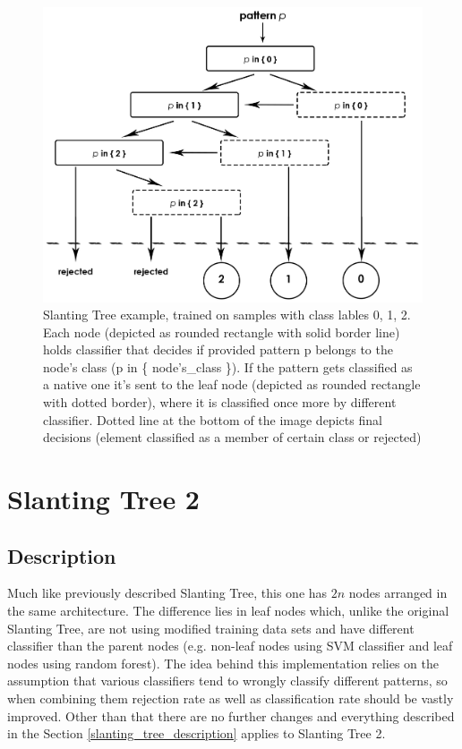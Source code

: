\begin{figure}[!t]
	\centering
	\includegraphics[width=1\textwidth]{Figures/slanting_tree.jpg}
	\caption{Slanting Tree example, trained on samples with class lables 0, 1, 2. Each node (depicted as rounded rectangle with solid border line) holds classifier that decides if provided pattern p belongs to the node's class (p in \{ node's\_class \}). If the pattern gets classified as a native one it's sent to the leaf node (depicted as rounded rectangle with dotted border), where it is classified once more by different classifier. Dotted line at the bottom of the image depicts final decisions (element classified as a member of certain class or rejected)}
	\label{fig:rejection_version2}\vspace{-3pt}
\end{figure}

\section{Slanting Tree 2}

\subsection{Description}

Much like previously described Slanting Tree, this one has $ 2n $ nodes arranged in the same architecture. The difference lies in leaf nodes which, unlike the original Slanting Tree, are not using modified training data sets and have different classifier than the parent nodes (e.g. non-leaf nodes using SVM classifier and leaf nodes using random forest). The idea behind this implementation relies on the assumption that various classifiers tend to wrongly classify different patterns, so when combining them rejection rate as well as classification rate should be vastly improved. Other than that there are no further changes and everything described in the Section \ref{slanting_tree_description} applies to Slanting Tree 2.

